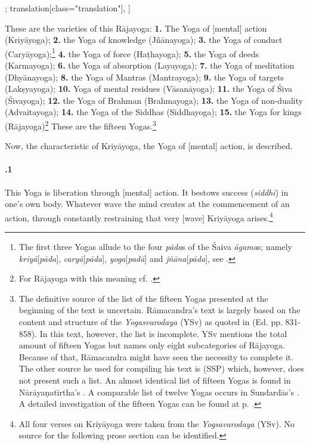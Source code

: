 \begin{alignment}[
  texts=edition[class="edition"];
  translation[class="translation"],
  ]
\begin{translation}
\begin{tlate}[p01_01]
These are the varieties of this Rājayoga: \textbf{1.} The Yoga of [mental] action (Kriyāyoga); \textbf{2.} the Yoga of knowledge (Jñānayoga); \textbf{3.} the Yoga of conduct (Caryāyoga);\footnote{The first three Yogas allude to the four \textit{pāda}s of the Śaiva \textit{āgama}s; namely \textit{kriyā}[\textit{pāda}], \textit{caryā}[\textit{pāda}], \textit{yoga}[\textit{padā}] and \textit{jñāna}[\textit{pāda}], see \citeauthor[2015: 77]{nishvasa2015}.} \textbf{4.} the Yoga of force (Haṭhayoga); \textbf{5.} the Yoga of deeds (Karmayoga); \textbf{6.} the Yoga of absorption (Layayoga); \textbf{7.} the Yoga of meditation (Dhyānayoga); \textbf{8.} the Yoga of Mantras (Mantrayoga); \textbf{9.} the Yoga of targets (Lakṣyayoga); \textbf{10.} Yoga of mental residues (Vāsanāyoga); \textbf{11.} the Yoga of Śiva (Śivayoga); \textbf{12.} the Yoga of Brahman (Brahmayoga); \textbf{13.} the Yoga of non-duality (Advaitayoga); \textbf{14.} the Yoga of the Siddhas (Siddhayoga); \textbf{15.} the Yoga for kings (Rājayoga)\footnote{For Rājayoga with this meaning cf. \citeauthor[2014:12]{birch2014}.} These are the fifteen Yogas.\footnote{The definitive source of the list of the fifteen Yogas presented at the beginning of the text is uncertain. Rāmacandra's text is largely based on the content and structure of the \textit{Yogasvarodaya} (YSv) as quoted in  (Ed. pp. 831-858). In this text, however, the list is incomplete. YSv mentions the total amount of fifteen Yogas but names only eight subcategories of Rājayoga. Because of that, Rāmacandra might have seen the necessity to complete it. The other source he used for compiling his text is  (SSP) which, however, does not present such a list. An almost identical list of fifteen Yogas is found in Nārāyaṇatīrtha's . A comparable list of twelve Yogas occurs in Sundardās's . A detailed investigation of the fifteen Yogas can be found at p. \pageref{yogas_list}.}
\end{tlate}
\begin{tlate}[02_1]
  \indent Now, the characteristic of Kriyāyoga, the Yoga of [mental] action, is described. \paragraph{.1} This Yoga is liberation through [mental] action. It bestows success (\textit{siddhi}) in one's own body. Whatever wave the mind creates at the commencement of an action, through constantly restraining that very [wave] Kriyāyoga arises.\footnote{All four verses on Kriyāyoga were taken from the \textit{Yogsavarodaya} (YSv). No source for the following prose section can be identified.}
    \end{tlate}
  \end{translation}
\end{alignment}
